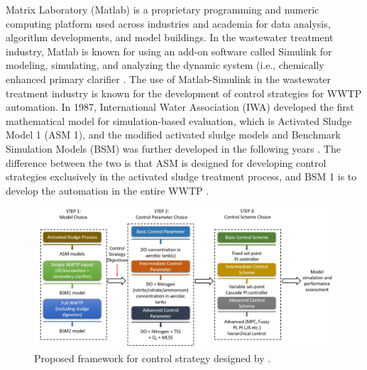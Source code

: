 Matrix Laboratory (Matlab) is a proprietary programming and numeric computing platform used across industries and academia for data analysis, algorithm developments, and model buildings. In the wastewater treatment industry, Matlab is known for using an add-on software called Simulink for modeling, simulating, and analyzing the dynamic system (i.e., chemically enhanced primary clarifier \citep{bachisModellingCharacterizationPrimary2015}. The use of Matlab-Simulink in the wastewater treatment industry is known for the development of control strategies for WWTP automation. In 1987, International Water Association (IWA) developed the first mathematical model for simulation-based evaluation, which is Activated Sludge Model 1 (ASM 1), and the modified activated sludge models and Benchmark Simulation Models (BSM) was further developed in the following years \citep{talibModelingControlWastewater2011}. The difference between the two is that ASM is designed for developing control strategies exclusively in the activated sludge treatment process, and BSM 1 is to develop the automation in the entire WWTP \citep{ballhysaWastewaterTreatmentPlant2020}. 

\begin{figure}[h]
   \centering
   \includegraphics[width=0.9\columnwidth]{imgs/propose-frameworks-for-control-strategy-design.png}
   \caption{Proposed framework for control strategy designed by \citet{ballhysaWastewaterTreatmentPlant2020}.}
   \label{fig:control-strategy-design}
\end{figure}
 
